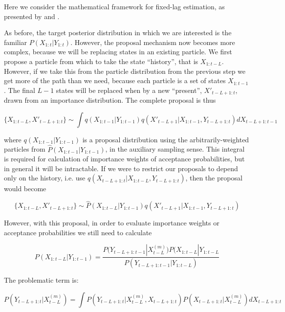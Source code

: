 Here we consider the mathematical framework for fixed-lag estimation, as presented by \cite{Doucet2006} and \cite{Briers2006}.

As before, the target posterior distribution in which we are interested is the familiar $P(X_{1:t}|Y_{1:t})$. However, the proposal mechanism now becomes more complex, because we will be replacing states in an existing particle. We first propose a particle from which to take the state ``history'', that is $X_{1:t-L}$. However, if we take this from the particle distribution from the previous step we get more of the path than we need, because each particle is a set of states $X_{1:t-1}$. The final $L-1$ states will be replaced when by a new ``present'', $X'_{t-L+1:t}$, drawn from an importance distribution. The complete proposal is thus

\begin{equation}
\{X_{1:t-L}, X'_{t-L+1:t}\} \sim \int q(X_{1:t-1}|Y_{1:t-1}) q(X'_{t-L+1}|X_{1:t-1}, Y_{t-L+1:t}) dX_{t-L+1:t-1}
\label{eq:DumbFLProposal1}
\end{equation}

where $q(X_{1:t-1}|Y_{1:t-1})$ is a proposal distribution using the arbitrarily-weighted particles from $\hat{P}(X_{1:t-1}|Y_{1:t-1})$, in the auxiliary sampling sense. This integral is required for calculation of importance weights of acceptance probabilities, but in general it will be intractable. If we were to restrict our proposals to depend only on the history, i.e. use $q(X_{t-L+1:t}|X_{1:t-L}, Y_{t-L+1:t})$, then the proposal would become

\begin{equation}
\{X_{1:t-L}, X'_{t-L+1:t}\} \sim \hat{P}(X_{1:t-L}|Y_{1:t-1}) q(X'_{t-L+1}|X_{1:t-1}, Y_{t-L+1:t})
\label{eq:DumbFLProposal2}
\end{equation}

However, with this proposal, in order to evaluate importance weights or acceptance probabilities we still need to calculate

\begin{equation}
P(X_{1:t-L}|Y_{1:t-1}) = \frac{P(Y_{t-L+1:t-1}|X_{t-L}^{(m)}) P(X_{1:t-L}|Y_{1:t-L} }{P(Y_{t-L+1:t-1}|Y_{1:t-L})}
\label{eq:}
\end{equation}

The problematic term is:

\begin{equation}
P(Y_{t-L+1:t}|X^{(m)}_{t-L}) = \int P(Y_{t-L+1:t}|X^{(m)}_{t-L}, X_{t-L+1:t}) P(X_{t-L+1:t}|X^{(m)}_{t-L}) dX_{t-L+1:t}
\label{eq:}
\end{equation}


